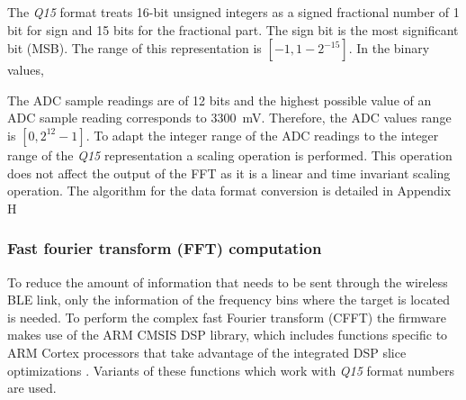 The \textit{Q15} format treats 16-bit unsigned integers as a signed fractional number of 1 bit for sign and 15 bits for the fractional part. The sign bit is the most significant bit (MSB). The range of this representation is $[-1, 1-2^{-15}]$. In the binary values,

The ADC sample readings are of 12 bits and the highest possible value of an ADC sample reading corresponds to \SI{3300}{\milli\volt}. Therefore, the ADC values range is $[0, 2^{12}-1]$. To adapt the integer range of the ADC readings to the integer range of the \textit{Q15} representation a scaling operation is performed. This operation does not affect the output of the FFT as it is a linear and time invariant scaling operation. The algorithm for the data format conversion is detailed in Appendix H %


\subsubsection{Fast fourier transform (FFT) computation}

To reduce the amount of information that needs to be sent through the wireless BLE link, only the information of the frequency bins where the target is located is needed. To perform the complex fast Fourier transform (CFFT) the firmware makes use of the ARM CMSIS DSP library, which includes functions specific to ARM Cortex processors that take advantage of the integrated DSP slice optimizations \cite{ARMM4, ARMCMSIS}. Variants of these functions which work with \textit{Q15} format numbers are used.

